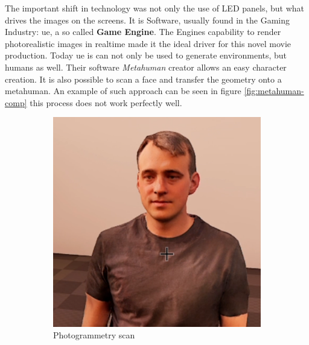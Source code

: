 \documentclass[
  a4paper,  %
  twoside,  %
  bibliography=totoc,
  headsepline,
  cleardoublepage=empty,
  parskip=half,
  draft=false
]{scrbook}
\begin{document}
The important shift in technology was not only the use of LED panels, but what drives the images on the screens. It is Software, usually found in the Gaming Industry: \gls{ue}, a so called \textbf{Game Engine}. The Engines capability to render photorealistic images in realtime made it the ideal driver for this novel movie production. Today \gls{ue} is can not only be used to generate environments, but humans as well. Their software \textit{Metahuman} creator allows an easy character creation. It is also possible to scan a face and transfer the geometry onto a metahuman. An example of such approach can be seen in figure \ref{fig:metahuman-comp} this process does not work perfectly well. 

\begin{figure}[h]
  \centering
  \begin{subfigure}[b]{0.45\textwidth}
    \includegraphics[width=\textwidth]{./graphics/images/photogrammetry.png}
    \caption{Photogrammetry scan}
    \label{fig:head-photogrammetry-scan}
  \end{subfigure}
  \hfill
  \begin{subfigure}[b]{0.5\textwidth}

\end{subfigure}
\end{figure}
\end{document}
